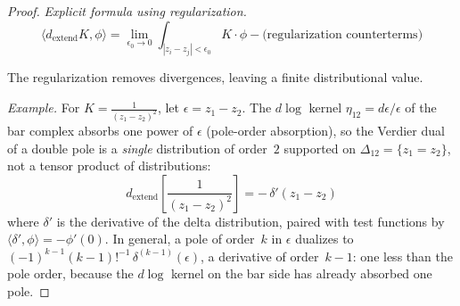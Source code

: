 \begin{proof}
\emph{Explicit formula using regularization.}
\[\langle d_{\text{extend}}K, \phi \rangle = \lim_{\epsilon_0 \to 0} \int_{|z_i - z_j|
< \epsilon_0} K \cdot \phi - \text{(regularization counterterms)}\]

The regularization removes divergences, leaving a finite distributional value.

\emph{Example.} For $K = \frac{1}{(z_1 - z_2)^2}$, let
$\epsilon = z_1 - z_2$. The $d\log$ kernel $\eta_{12} = d\epsilon/\epsilon$
of the bar complex absorbs one power of $\epsilon$ (pole-order
absorption), so the Verdier dual of a double pole is a
\emph{single} distribution of order~$2$ supported on
$\Delta_{12} = \{z_1 = z_2\}$, not a tensor product of distributions:
\[
d_{\text{extend}}\!\left[\frac{1}{(z_1 - z_2)^2}\right]
= -\,\delta'(z_1 - z_2)
\]
where $\delta'$ is the derivative of the delta distribution, paired with
test functions by $\langle \delta', \phi \rangle = -\phi'(0)$. In
general, a pole of order~$k$ in $\epsilon$ dualizes to
$(-1)^{k-1}(k-1)!^{-1}\,\delta^{(k-1)}(\epsilon)$, a derivative of
order~$k-1$: one less than the pole order, because the $d\log$ kernel
on the bar side has already absorbed one pole.
\end{proof}

